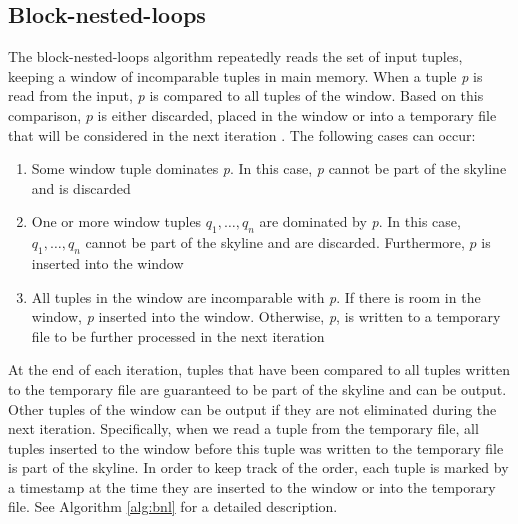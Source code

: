 \documentclass[12pt,a4paper,twoside]{report}
\begin{document}
\subsection{Block-nested-loops}

The block-nested-loops algorithm repeatedly reads the set of input
tuples, keeping a window of incomparable tuples in main memory.
When a tuple \textit{p} is read from the input, \textit{p} is compared
to all tuples of the window. Based on this comparison, $p$ is either
discarded, placed in the window or into a temporary file that will be
considered in the next iteration \cite{borzsony2001skyline}. The
following cases can occur:

\begin{enumerate}

	\item Some window tuple dominates \textit{p}. In this case,
	\textit{p} cannot be part of the skyline and is discarded

	\item One or more window tuples $q_1, \ldots, q_n$ are dominated
	by \textit{p}. In this case, $q_1, \ldots, q_n$ cannot be part of
	the skyline and are discarded. Furthermore, $p$ is inserted into
	the window

	\item All tuples in the window are incomparable with \textit{p}.
	If there is room in the window, \textit{p} inserted into the
	window. Otherwise, \textit{p}, is written to a temporary file to
	be further processed in the next iteration

\end{enumerate}

At the end of each iteration, tuples that have been compared to all
tuples written to the temporary file are guaranteed to be part of the
skyline and can be output. Other tuples of the window can be output if
they are not eliminated during the next iteration. Specifically, when
we read a tuple from the temporary file, all tuples inserted to the
window before this tuple was written to the temporary file is part of
the skyline. In order to keep track of the order, each tuple is marked
by a timestamp at the time they are inserted to the window or into the
temporary file. See Algorithm \ref{alg:bnl} for a detailed description.
\end{document}
